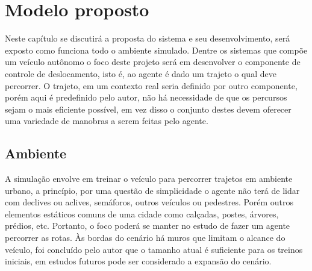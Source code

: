 \chapter{Modelo proposto}\label{cap:proposta}
Neste capítulo se discutirá a proposta do sistema e seu desenvolvimento, será exposto como funciona todo o ambiente simulado. Dentre os sistemas que compõe um veículo autônomo o foco deste projeto será em desenvolver o componente de controle de deslocamento, isto é, ao agente é dado um trajeto o qual deve percorrer. O trajeto, em um contexto real seria definido por outro componente, porém aqui é predefinido pelo autor, não há necessidade de que os percursos sejam o mais eficiente possível, em vez disso o conjunto destes devem oferecer uma variedade de manobras a serem feitas pelo agente.


\section{Ambiente}
A simulação envolve em treinar o veículo para percorrer trajetos em ambiente urbano, a princípio, por uma questão de simplicidade o agente não terá de lidar com declives ou aclives, semáforos, outros veículos ou pedestres. Porém outros elementos estáticos comuns de uma cidade como calçadas, postes, árvores, prédios, etc. Portanto, o foco poderá se manter no estudo de fazer um agente percorrer as rotas. Às bordas do cenário há muros que limitam o alcance do veículo, foi concluído pelo autor que o tamanho atual é suficiente para os treinos iniciais, em estudos futuros pode ser considerado a expansão do cenário.

